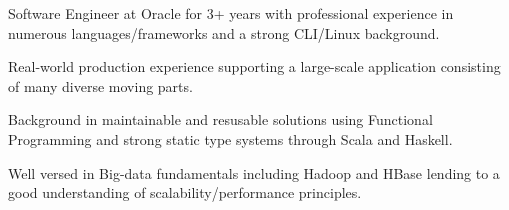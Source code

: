 

\begin{cvparagraph}


Software Engineer at Oracle for 3+ years with professional experience in numerous languages/frameworks and a strong CLI/Linux background.

Real-world production experience supporting a large-scale application consisting of many diverse moving parts.

Background in maintainable and resusable solutions using Functional Programming and strong static type systems through Scala and Haskell.

Well versed in Big-data fundamentals including Hadoop and HBase lending to a good understanding of scalability/performance principles.

\end{cvparagraph}
